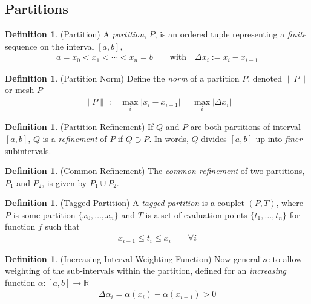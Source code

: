 \documentclass[12pt]{article}
\numberwithin{equation}{section} %
\theoremstyle{plain}
\theoremstyle{definition}
\newtheorem{defn}[thm]{Definition}
\theoremstyle{remark}
\begin{document}
\subsection{Partitions}

\begin{defn}(Partition)
A \emph{partition}, $P$, is an ordered tuple representing a
\emph{finite} sequence on the interval $[a,b]$,
\begin{align*}
  a = x_0 < x_1 < \cdots < x_n = b
  \qquad \text{with} \quad \Delta x_i := x_i - x_{i-1}
\end{align*}
\end{defn}

\begin{defn}(Partition Norm)
Define the \emph{norm} of a partition $P$, denoted $\lVert P\rVert$ or
mesh $P$
\begin{align*}
  \lVert P \rVert := \max_i |x_i - x_{i-1}| = \max_i |\Delta x_i|
\end{align*}
\end{defn}

\begin{defn}(Partition Refinement)
If $Q$ and $P$ are both partitions of interval $[a,b]$, $Q$ is a
\emph{refinement} of $P$ if $Q \supset P$.
In words, $Q$ divides $[a,b]$ up into \emph{finer} subintervals.
\end{defn}

\begin{defn}(Common Refinement)
The \emph{common refinement} of two partitions, $P_1$ and $P_2$, is
given by $P_1 \cup P_2$.
\end{defn}

\begin{defn}(Tagged Partition)
A \emph{tagged partition} is a couplet $(P,T)$, where $P$ is some
partition $\{x_0, \ldots, x_n\}$ and $T$ is a set of evaluation points
$\{t_1, \ldots, t_n\}$ for function $f$ such that
\begin{align*}
  x_{i-1} \leq t_i \leq x_i
  \qquad\forall i
\end{align*}
\end{defn}


\begin{defn}(Increasing Interval Weighting Function)
Now generalize to allow weighting of the sub-intervals within the
partition, defined for an \emph{increasing} function
$\alpha: [a,b] \rightarrow \mathbb{R}$
\begin{align*}
  \Delta \alpha_i = \alpha(x_i) - \alpha(x_{i-1}) > 0
\end{align*}
\end{defn}
\end{document}
